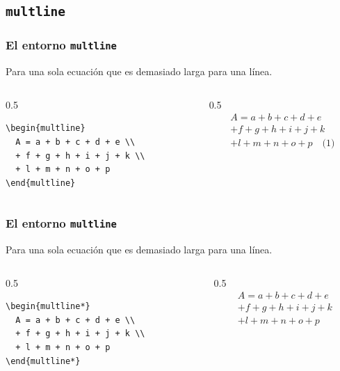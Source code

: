 \documentclass[12pt,aspectratio=169,ignorenonframetext]{ltxbeamer}
\begin{document}
\subsection{\texttt{multline}}

\begin{frame}[fragile]
\frametitle{El entorno \texttt{multline}}
Para una sola ecuación que es demasiado larga para una línea.

\begin{columns}
    \begin{column}{0.5\textwidth}
        \begin{verbatim}
\begin{multline}
  A = a + b + c + d + e \\
  + f + g + h + i + j + k \\
  + l + m + n + o + p
\end{multline}
        \end{verbatim}
    \end{column}
    {\color{gray} \vline}
    \begin{column}{0.5\textwidth}
        \lmr
        \begin{multline*}
            A = a + b + c + d + e \\
            + f + g + h + i + j + k \\
            + l + m + n + o + p \quad \text{(1)}
        \end{multline*}
    \end{column}
\end{columns}
\end{frame}





\begin{frame}[fragile]
\frametitle{El entorno \texttt{multline}}
Para una sola ecuación que es demasiado larga para una línea.

\begin{columns}
    \begin{column}{0.5\textwidth}
        \begin{verbatim}
\begin{multline*}
  A = a + b + c + d + e \\
  + f + g + h + i + j + k \\
  + l + m + n + o + p
\end{multline*}
        \end{verbatim}
    \end{column}
    {\color{gray} \vline}
    \begin{column}{0.5\textwidth}
        \begin{multline*}
            A = a + b + c + d + e \\
            + f + g + h + i + j + k \\
            + l + m + n + o + p
        \end{multline*}
    \end{column}
\end{columns}
\end{frame}
\end{document}

